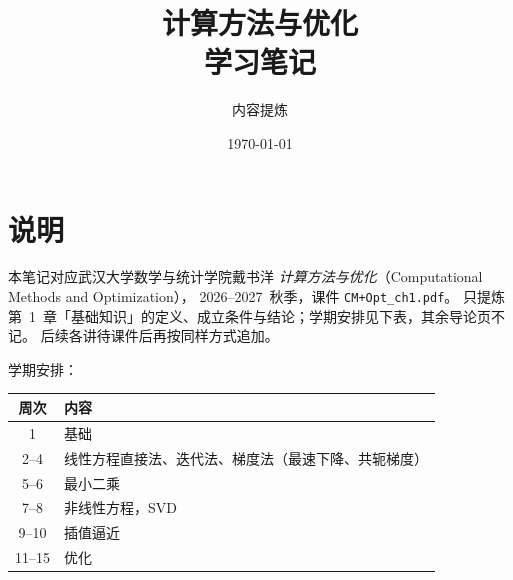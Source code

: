 \documentclass[UTF8,zihao=-4,openany]{ctexbook}
\title{\heiti 计算方法与优化\\[0.4em]\Large 学习笔记}
\author{内容提炼}
\date{\today}
\begin{document}
\maketitle
\frontmatter

\chapter*{说明}
本笔记对应武汉大学数学与统计学院戴书洋
\emph{计算方法与优化}（Computational Methods and Optimization），
2026--2027~秋季，课件 \texttt{CM+Opt\_ch1.pdf}。
只提炼第~1~章「基础知识」的定义、成立条件与结论；学期安排见下表，其余导论页不记。
后续各讲待课件后再按同样方式追加。

学期安排：
\begin{center}
\begin{tabular}{cl}
\toprule
周次 & 内容\\
\midrule
1 & 基础\\
2--4 & 线性方程直接法、迭代法、梯度法（最速下降、共轭梯度）\\
5--6 & 最小二乘\\
7--8 & 非线性方程，SVD\\
9--10 & 插值逼近\\
11--15 & 优化\\
\bottomrule
\end{tabular}
\end{center}

\hypertarget{contents}{}
\tableofcontents

\mainmatter

\end{document}
